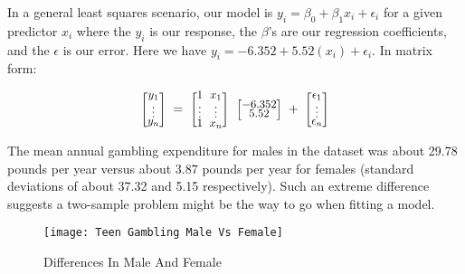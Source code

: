 \documentclass[12pt, letterpaper]{article}
\theoremstyle{definition}
\numberwithin{equation}{section}
\newcommand{\mymatrix}[1]{
	\renewcommand{\arraystretch}{0.5} 
	\setlength\arraycolsep{3pt}       
	\scalebox{0.90}{                  
		$\begin{bmatrix}
			#1
		\end{bmatrix}$
	}                   
	\renewcommand{\arraystretch}{1.0} 
	\setlength\arraycolsep{6pt}       
}
\newcommand{\+}[1]{+_{\scalebox{.375}{#1}}}
\newcommand{\1}{\mathbbm{1}}
\begin{document}
\vspace{\baselineskip}
\noindent\textbf{}
\vspace{\baselineskip}

In a general least squares scenario, our model is $y_i=\beta_0+\beta_1x_i+\epsilon_i$ for a given predictor $x_i$ where the $y_i$ is our response, the $\beta$'s are our regression coefficients, and the $\epsilon$ is our error. Here we have $y_i=-6.352+5.52(x_i)+\epsilon_i$. In matrix form:

\vspace{-0.5cm}
\begin{align*}
\mymatrix{y_1\\ \vdots \\y_n}=\mymatrix{1 & x_1\\ \vdots &\vdots\\1&x_n} \mymatrix{-6.352\\5.52}+\mymatrix{\epsilon_1\\ \vdots\\ \epsilon_n}
\end{align*}



\vspace{\baselineskip}
\noindent\textbf{}
\vspace{\baselineskip}

The mean annual gambling expenditure for males in the dataset was about 29.78 pounds per year versus about 3.87 pounds per year for females (standard deviations of about 37.32 and 5.15 respectively). Such an extreme difference suggests a two-sample problem might be the way to go when fitting a model.

\begin{figure}[H]
	\centering
	\texttt{[image: Teen Gambling Male Vs Female]}
	\caption{Differences In Male And Female}
	\label{fig.femalevsmale}
\end{figure}
\vspace{-0.5cm}



\vspace{\baselineskip}
\noindent\textbf{}
\vspace{\baselineskip}
\end{document}
